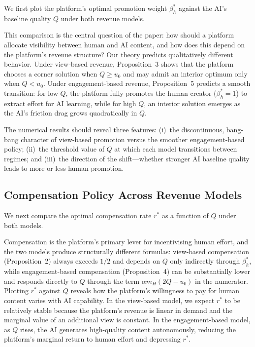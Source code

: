 \documentclass[mnsc,nonblindrev]{informs3_NoOR}
\begin{document}
We first plot the platform's optimal promotion weight $\beta_h^*$ against the AI's baseline quality $Q$ under both revenue models.
 
This comparison is the central question of the paper: how should a platform allocate visibility between human and AI content, and how does this depend on the platform's revenue structure? Our theory predicts qualitatively different behavior. Under view-based revenue, Proposition~3 shows that the platform chooses a corner solution when $Q \geq u_0$ and may admit an interior optimum only when $Q < u_0$. Under engagement-based revenue, Proposition~5 predicts a smooth transition: for low $Q$, the platform fully promotes the human creator ($\beta_h^* = 1$) to extract effort for AI learning, while for high $Q$, an interior solution emerges as the AI's friction drag grows quadratically in $Q$.
 
The numerical results should reveal three features: (i)~the discontinuous, bang-bang character of view-based promotion versus the smoother engagement-based policy; (ii)~the threshold value of $Q$ at which each model transitions between regimes; and (iii)~the direction of the shift---whether stronger AI baseline quality leads to more or less human promotion.
 
\subsection{Compensation Policy Across Revenue Models}
 
We next compare the optimal compensation rate $r^*$ as a function of $Q$ under both models.
 
Compensation is the platform's primary lever for incentivising human effort, and the two models produce structurally different formulas: view-based compensation (Proposition~2) always exceeds $1/2$ and depends on $Q$ only indirectly through $\beta_h^*$, while engagement-based compensation (Proposition~4) can be substantially lower and responds directly to $Q$ through the term $\alpha m_H(2Q - u_0)$ in the numerator. Plotting $r^*$ against $Q$ reveals how the platform's willingness to pay for human content varies with AI capability. In the view-based model, we expect $r^*$ to be relatively stable because the platform's revenue is linear in demand and the marginal value of an additional view is constant. In the engagement-based model, as $Q$ rises, the AI generates high-quality content autonomously, reducing the platform's marginal return to human effort and depressing $r^*$.
 
\end{document}
